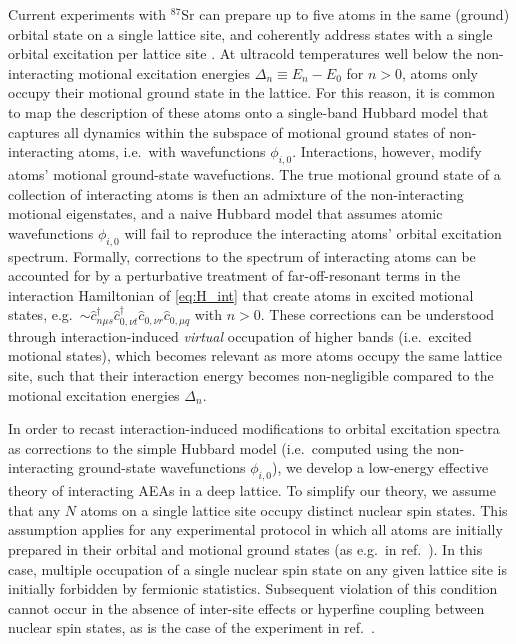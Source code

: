 \documentclass[preprint,showkeys,nofootinbib]{revtex4-1}
\renewcommand{\c}{\hat{c}}
\newcommand{\1}{\mathds{1}}
\begin{document}
Current experiments with ${}^{87}$Sr can prepare up to five atoms in
the same (ground) orbital state on a single lattice site, and
coherently address states with a single orbital excitation per lattice
site \cite{goban2018emergence}.  At ultracold temperatures well below
the non-interacting motional excitation energies
$\Delta_n\equiv E_n-E_0$ for $n>0$, atoms only occupy their motional
ground state in the lattice.  For this reason, it is common to map the
description of these atoms onto a single-band Hubbard model that
captures all dynamics within the subspace of motional ground states of
non-interacting atoms, i.e.~with wavefunctions $\phi_{i,0}$.
Interactions, however, modify atoms' motional ground-state
wavefuctions.  The true motional ground state of a collection of
interacting atoms is then an admixture of the non-interacting motional
eigenstates, and a naive Hubbard model that assumes atomic
wavefunctions $\phi_{i,0}$ will fail to reproduce the interacting
atoms' orbital excitation spectrum.  Formally, corrections to the
spectrum of interacting atoms can be accounted for by a perturbative
treatment of far-off-resonant terms in the interaction Hamiltonian of
\eqref{eq:H_int} that create atoms in excited motional states,
e.g.~$\sim\c_{n\mu s}^\dag \c_{0,\nu t}^\dag \c_{0,\nu r} \c_{0,\mu
  q}$ with $n>0$.  These corrections can be understood through
interaction-induced {\it virtual} occupation of higher bands
(i.e.~excited motional states), which becomes relevant as more atoms
occupy the same lattice site, such that their interaction energy
becomes non-negligible compared to the motional excitation energies
$\Delta_n$.

In order to recast interaction-induced modifications to orbital
excitation spectra as corrections to the simple Hubbard model
(i.e.~computed using the non-interacting ground-state wavefunctions
$\phi_{i,0}$), we develop a low-energy effective theory of interacting
AEAs in a deep lattice.  To simplify our theory, we assume that any
$N$ atoms on a single lattice site occupy distinct nuclear spin
states.  This assumption applies for any experimental protocol in
which all atoms are initially prepared in their orbital and motional
ground states (as e.g.~in ref.~\cite{goban2018emergence}).  In this
case, multiple occupation of a single nuclear spin state on any given
lattice site is initially forbidden by fermionic statistics.
Subsequent violation of this condition cannot occur in the absence of
inter-site effects or hyperfine coupling between nuclear spin states,
as is the case of the experiment in ref.~\cite{goban2018emergence}.
\end{document}
